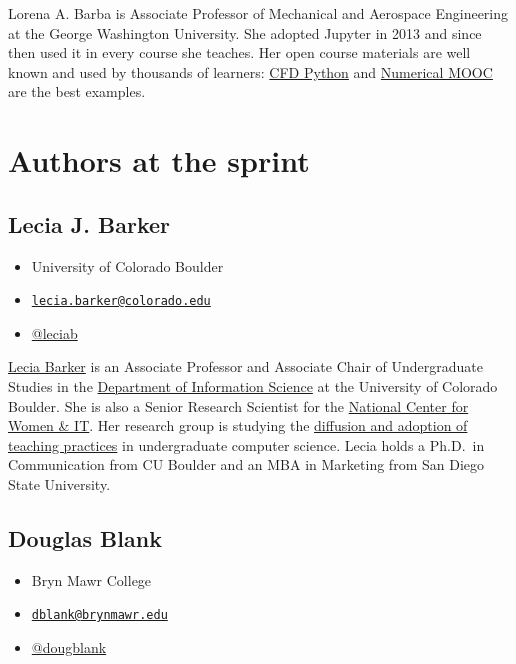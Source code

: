 \documentclass[]{book}
\providecommand{\tightlist}{%
  \setlength{\itemsep}{0pt}\setlength{\parskip}{0pt}}
\begin{document}
Lorena A. Barba is Associate Professor of Mechanical and Aerospace
Engineering at the George Washington University. She adopted Jupyter in
2013 and since then used it in every course she teaches. Her open course
materials are well known and used by thousands of learners:
\href{http://lorenabarba.com/blog/cfd-python-12-steps-to-navier-stokes/}{CFD
Python} and
\href{https://github.com/numerical-mooc/numerical-mooc}{Numerical MOOC}
are the best examples.

\section{Authors at the sprint}\label{authors-at-the-sprint}

\subsection{Lecia J. Barker}\label{lecia-j.-barker}

\begin{itemize}
\tightlist
\item
  University of Colorado Boulder
\item
  \href{mailto:lecia.barker@colorado.edu}{\nolinkurl{lecia.barker@colorado.edu}}
\item
  \href{https://twitter.com/leciab}{@leciab}
\end{itemize}

\href{https://www.colorado.edu/cmci/people/information-science/lecia-barker}{Lecia
Barker} is an Associate Professor and Associate Chair of Undergraduate
Studies in the
\href{https://www.colorado.edu/cmci/infoscience}{Department of
Information Science} at the University of Colorado Boulder. She is also
a Senior Research Scientist for the
\href{https://www.ncwit.org/}{National Center for Women \& IT}. Her
research group is studying the
\href{https://csteachingpractices.wordpress.com/}{diffusion and adoption
of teaching practices} in undergraduate computer science. Lecia holds a
Ph.D.~in Communication from CU Boulder and an MBA in Marketing from San
Diego State University.

\subsection{Douglas Blank}\label{douglas-blank}

\begin{itemize}
\tightlist
\item
  Bryn Mawr College
\item
  \href{mailto:dblank@brynmawr.edu}{\nolinkurl{dblank@brynmawr.edu}}
\item
  \href{https://twitter.com/dougblank}{@dougblank}
\end{itemize}
\end{document}
